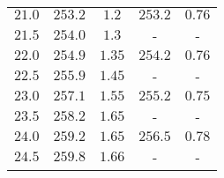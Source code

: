 \begin{table}
\begin{tabular}{c c c c c}
        $\num{21.0}$&$\num{253.2}$&$\num{1.2}$&$\num{253.2}$&$\num{0.76}$\\
        $\num{21.5}$&$\num{254.0}$&$\num{1.3}$&-&-\\
        $\num{22.0}$&$\num{254.9}$&$\num{1.35}$&$\num{254.2}$&$\num{0.76}$\\
        $\num{22.5}$&$\num{255.9}$&$\num{1.45}$&-&-\\
        $\num{23.0}$&$\num{257.1}$&$\num{1.55}$&$\num{255.2}$&$\num{0.75}$\\
        $\num{23.5}$&$\num{258.2}$&$\num{1.65}$&-&-\\
        $\num{24.0}$&$\num{259.2}$&$\num{1.65}$&$\num{256.5}$&$\num{0.78}$\\
        $\num{24.5}$&$\num{259.8}$&$\num{1.66}$&-&-\\  
        \bottomrule                                                                                                                                                                                                                                                                                                                                                                                                                                                                                                                                                                                                                                                      
    \end{tabular}
\end{table}
